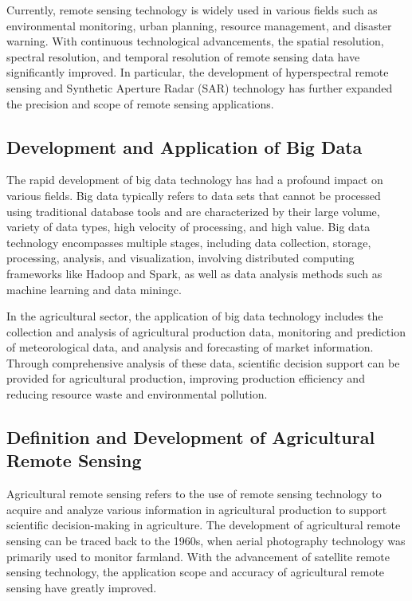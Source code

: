 Currently, remote sensing technology is widely used in various fields such as environmental monitoring\cite{li2020review}, urban planning\cite{wellmann2020remote}, resource management\cite{kumar2015applications}, and disaster warning\cite{gupta2022smart}. With continuous technological advancements, the spatial resolution, spectral resolution, and temporal resolution of remote sensing data have significantly improved. In particular, the development of hyperspectral remote sensing and Synthetic Aperture Radar (SAR)\cite{Syntheti6:online} technology has further expanded the precision and scope of remote sensing applications.

\subsection{Development and Application of Big Data}

The rapid development of big data technology has had a profound impact on various fields. Big data typically refers to data sets that cannot be processed using traditional database tools and are characterized by their large volume, variety of data types, high velocity of processing, and high value. Big data technology encompasses multiple stages, including data collection, storage, processing, analysis, and visualization, involving distributed computing frameworks like Hadoop and Spark, as well as data analysis methods such as machine learning and data miningc\cite{mandalImpactAgriculturalManagement2022}.

In the agricultural sector, the application of big data technology includes the collection and analysis of agricultural production data, monitoring and prediction of meteorological data, and analysis and forecasting of market information. Through comprehensive analysis of these data, scientific decision support can be provided for agricultural production, improving production efficiency and reducing resource waste and environmental pollution.

\subsection{Definition and Development of Agricultural Remote Sensing}

Agricultural remote sensing refers to the use of remote sensing technology to acquire and analyze various information in agricultural production to support scientific decision-making in agriculture. The development of agricultural remote sensing can be traced back to the 1960s, when aerial photography technology was primarily used to monitor farmland. With the advancement of satellite remote sensing technology, the application scope and accuracy of agricultural remote sensing have greatly improved.

